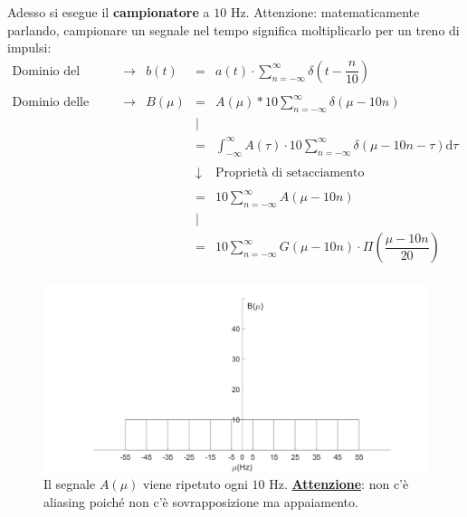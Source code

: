 \documentclass[a4paper]{article}
\begin{document}
	\noindent
	Adesso si esegue il \textbf{campionatore} a $10$ Hz. Attenzione: matematicamente parlando, campionare un segnale nel tempo significa moltiplicarlo per un treno di impulsi:
	\begin{equation*}
		\begin{array}{lllcl}
			\text{Dominio del tempo } & \longrightarrow & b\left(t\right) & = & a\left(t\right) \cdot \displaystyle\sum_{n = -\infty}^{\infty} \delta\left(t - \dfrac{n}{10}\right) \\
			&&&& \\
			\text{Dominio delle frequenze } & \longrightarrow & B\left(\mu\right) & = & A\left(\mu\right) * 10 \displaystyle\sum_{n = -\infty}^{\infty} \delta\left(\mu - 10n\right) \\
			&&& | & \\
			&&&=& \displaystyle\int_{-\infty}^{\infty} A\left(\tau\right) \cdot 10\displaystyle\sum_{n=-\infty}^{\infty} \delta\left(\mu - 10n - \tau\right) \mathrm{d}\tau \\
			&&&& \\
			&&& \downarrow & \text{Proprietà di setacciamento} \\
			&&&& \\
			&&&=& 10\displaystyle\sum_{n=-\infty}^{\infty} A\left(\mu - 10n\right) \\
			&&& | & \\
			&&&=& 10\displaystyle\sum_{n=-\infty}^{\infty} G\left(\mu - 10n\right) \cdot \Pi\left(\dfrac{\mu - 10n}{20}\right) \\
		\end{array}
	\end{equation*}
	\begin{figure}[!htp]
		\centering
		\includegraphics[width=\textwidth]{img/segnale_A-campionatore.PNG}
		\caption*{Il segnale $A\left(\mu\right)$ viene ripetuto ogni $10$ Hz.\newline
			\textbf{\underline{Attenzione}}: non c'è aliasing poiché non c'è sovrapposizione ma appaiamento.}
	\end{figure}\newpage
\end{document}
